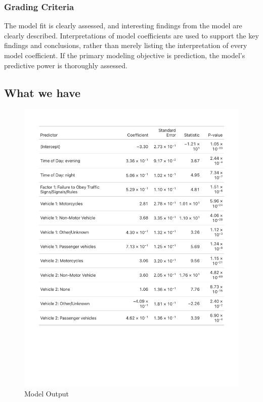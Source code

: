 \documentclass[
  letterpaper,
  DIV=11,
  numbers=noendperiod]{scrartcl}
\begin{document}
\hypertarget{grading-criteria-2}{%
\subsubsection{Grading Criteria}\label{grading-criteria-2}}

The model fit is clearly assessed, and interesting findings from the
model are clearly described. Interpretations of model coefficients are
used to support the key findings and conclusions, rather than merely
listing the interpretation of every model coefficient. If the primary
modeling objective is prediction, the model's predictive power is
thoroughly assessed.

\hypertarget{what-we-have-2}{%
\subsection{What we have}\label{what-we-have-2}}

\begin{figure}

{\centering \includegraphics{table1.pdf}

}

\caption{Model Output}

\end{figure}
\end{document}
